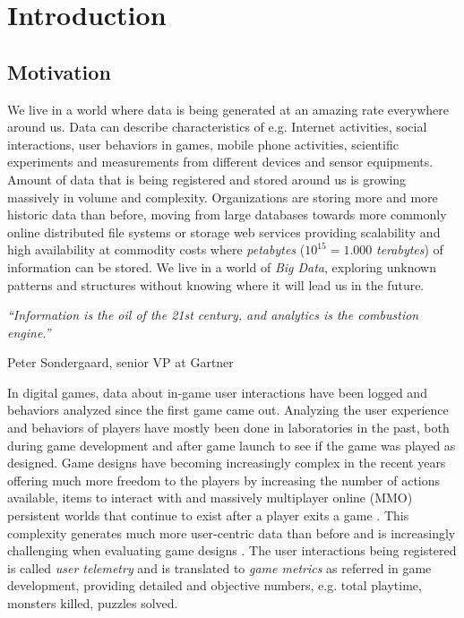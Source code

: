 
\chapter{Introduction} %
\label{Chapter1}

\section{Motivation}
We live in a world where data is being generated at an amazing rate everywhere around us. Data can describe characteristics of e.g. Internet activities, social interactions, user behaviors in games, mobile phone activities, scientific experiments and measurements from different devices and sensor equipments. Amount of data that is being registered and stored around us is growing massively in volume and complexity. Organizations are storing more and more historic data than before, moving from large databases towards more commonly online distributed file systems or storage web services providing scalability and high availability at commodity costs where \textit{petabytes} ($10^{15} = 1.000$ \textit{terabytes}) of information can be stored. We live in a world of \textit{Big Data}, exploring unknown patterns and structures without knowing where it will lead us in the future. 

\null
\textit{``Information is the oil of the 21st century, and analytics is the combustion engine.''}

\begin{flushright}
Peter Sondergaard, senior VP at Gartner
\end{flushright}

In digital games, data about in-game user interactions have been logged and behaviors analyzed since the first game came out. Analyzing the user experience and behaviors of players have mostly been done in laboratories in the past, both during game development and after game launch to see if the game was played as designed. Game designs have becoming increasingly complex in the recent years offering much more freedom to the players by increasing the number of actions available, items to interact with and massively multiplayer online (MMO) persistent worlds that continue to exist after a player exits a game \citep{Kim:2008Tracking, Drachen:2011Evaluating}. This complexity generates much more user-centric data than before and is increasingly challenging when evaluating game designs \cite{Pagulayan:2002UserDesign, Seif:2013GameAnalytics}. The user interactions being registered is called \textit{user telemetry} and is translated to \textit{game metrics} as referred in game development, providing detailed and objective numbers, e.g. total playtime, monsters killed, puzzles solved.


